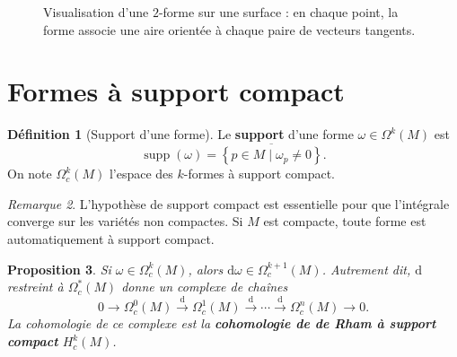 \documentclass[12pt,a4paper,openany]{book}
\theoremstyle{definition}
\newtheorem{definition}{Définition}[chapter]
\theoremstyle{plain}
\newtheorem{proposition}[definition]{Proposition}
\theoremstyle{remark}
\newtheorem{remarque}[definition]{Remarque}
\newcommand{\dd}{\mathrm{d}}
\newcommand{\set}[1]{\left\{#1\right\}}
\begin{document}
\begin{figure}[ht]
\centering
{}
\caption{Visualisation d'une $2$-forme sur une surface : en chaque point,
  la forme associe une aire orientée à chaque paire de vecteurs tangents.}
\label{fig:forme-differentielle}
\end{figure}

\section{Formes à support compact}\label{sec:support-compact}

\begin{definition}[Support d'une forme]\label{def:support-forme}%
Le \textbf{support} d'une forme $\omega \in \Omega^k(M)$ est
\[
  \operatorname{supp}(\omega) = \overline{\set{p \in M \mid
    \omega_p \neq 0}}.
\]
On note $\Omega^k_c(M)$ l'espace des $k$-formes à support compact.
\end{definition}

\begin{remarque}\label{rem:support-compact-important}
L'hypothèse de support compact est essentielle pour que l'intégrale
converge sur les variétés non compactes. Si $M$ est compacte, toute
forme est automatiquement à support compact.
\end{remarque}

\begin{proposition}\label{prop:d-support-compact}
Si $\omega \in \Omega^k_c(M)$, alors $\dd\omega \in \Omega^{k+1}_c(M)$.
Autrement dit, $\dd$ restreint à $\Omega^*_c(M)$ donne un complexe de
chaînes
\[
  0 \to \Omega^0_c(M) \xrightarrow{\dd} \Omega^1_c(M) \xrightarrow{\dd}
    \cdots \xrightarrow{\dd} \Omega^n_c(M) \to 0.
\]
La cohomologie de ce complexe est la \textbf{cohomologie de de Rham à
support compact}
$H^k_c(M)$.
\end{proposition}
\end{document}
